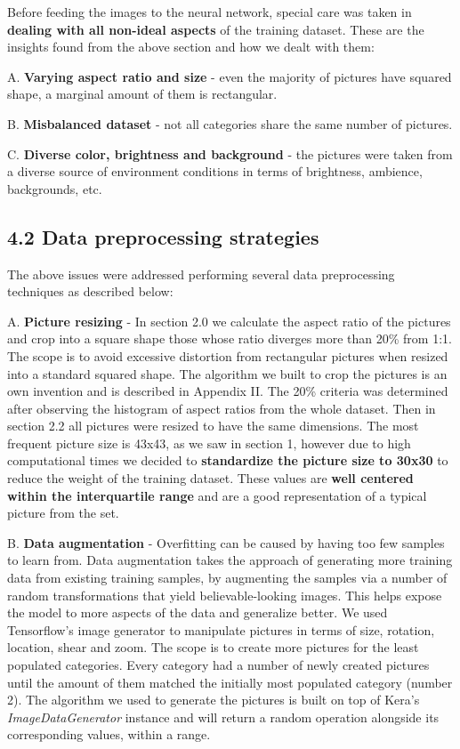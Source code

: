 \documentclass[
  11pt,
]{article}
\begin{document}
Before feeding the images to the neural network, special care was taken
in \textbf{dealing with all non-ideal aspects} of the training dataset.
These are the insights found from the above section and how we dealt
with them:

A. \textbf{Varying aspect ratio and size} - even the majority of
pictures have squared shape, a marginal amount of them is rectangular.

B. \textbf{Misbalanced dataset} - not all categories share the same
number of pictures.

C. \textbf{Diverse color, brightness and background} - the pictures were
taken from a diverse source of environment conditions in terms of
brightness, ambience, backgrounds, etc.

\hypertarget{data-preprocessing-strategies}{%
\subsection{4.2 Data preprocessing
strategies}\label{data-preprocessing-strategies}}

The above issues were addressed performing several data preprocessing
techniques as described below:

A. \textbf{Picture resizing} - In section 2.0 we calculate the aspect
ratio of the pictures and crop into a square shape those whose ratio
diverges more than 20\% from 1:1. The scope is to avoid excessive
distortion from rectangular pictures when resized into a standard
squared shape. The algorithm we built to crop the pictures is an own
invention and is described in Appendix II. The 20\% criteria was
determined after observing the histogram of aspect ratios from the whole
dataset. Then in section 2.2 all pictures were resized to have the same
dimensions. The most frequent picture size is 43x43, as we saw in
section 1, however due to high computational times we decided to
\textbf{standardize the picture size to 30x30} to reduce the weight of
the training dataset. These values are \textbf{well centered within the
interquartile range} and are a good representation of a typical picture
from the set.

B. \textbf{Data augmentation} - Overfitting can be caused by having too
few samples to learn from. Data augmentation takes the approach of
generating more training data from existing training samples, by
augmenting the samples via a number of random transformations that yield
believable-looking images. This helps expose the model to more aspects
of the data and generalize better. We used Tensorflow's image generator
to manipulate pictures in terms of size, rotation, location, shear and
zoom. The scope is to create more pictures for the least populated
categories. Every category had a number of newly created pictures until
the amount of them matched the initially most populated category (number
2). The algorithm we used to generate the pictures is built on top of
Kera's \emph{ImageDataGenerator} instance and will return a random
operation alongside its corresponding values, within a range.
\end{document}
